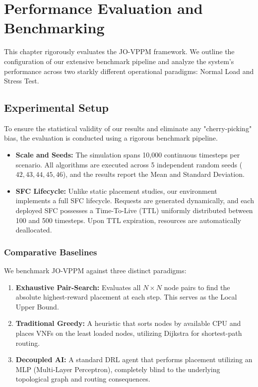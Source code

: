 \chapter{Performance Evaluation and Benchmarking}
\label{chap:experiments}

This chapter rigorously evaluates the JO-VPPM framework. We outline the configuration of our extensive benchmark pipeline and analyze the system's performance across two starkly different operational paradigms: Normal Load and Stress Test.

\section{Experimental Setup}
To ensure the statistical validity of our results and eliminate any "cherry-picking" bias, the evaluation is conducted using a rigorous benchmark pipeline.
\begin{itemize}
    \item \textbf{Scale and Seeds:} The simulation spans 10,000 continuous timesteps per scenario. All algorithms are executed across 5 independent random seeds ($42, 43, 44, 45, 46$), and the results report the Mean and Standard Deviation.
    \item \textbf{SFC Lifecycle:} Unlike static placement studies, our environment implements a full SFC lifecycle. Requests are generated dynamically, and each deployed SFC possesses a Time-To-Live (TTL) uniformly distributed between 100 and 500 timesteps. Upon TTL expiration, resources are automatically deallocated.
\end{itemize}

\subsection{Comparative Baselines}
We benchmark JO-VPPM against three distinct paradigms:
\begin{enumerate}
    \item \textbf{Exhaustive Pair-Search:} Evaluates all $N \times N$ node pairs to find the absolute highest-reward placement at each step. This serves as the Local Upper Bound.
    \item \textbf{Traditional Greedy:} A heuristic that sorts nodes by available CPU and places VNFs on the least loaded nodes, utilizing Dijkstra for shortest-path routing.
    \item \textbf{Decoupled AI:} A standard DRL agent that performs placement utilizing an MLP (Multi-Layer Perceptron), completely blind to the underlying topological graph and routing consequences.
\end{enumerate}

